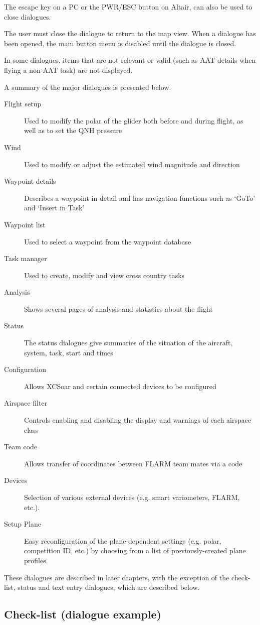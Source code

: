 The escape key on a PC or the PWR/ESC button on Altair, can also be used to
close dialogues.

The user must close the dialogue to return to the map view. When a dialogue
has been opened, the main button menu is disabled until the dialogue is closed.

In some dialogues, items that are not relevant or valid (such as AAT details when
flying a non-AAT task) are not displayed.

A summary of the major dialogues is presented below.
\begin{description}
\item[Flight setup] Used to modify the polar of the glider both before and
during flight, as well as to set the QNH pressure
\item[Wind] Used to modify or adjust the estimated wind magnitude and direction
\item[Waypoint details] Describes a waypoint in detail and has navigation
functions such as `GoTo' and `Insert in Task'
\item[Waypoint list] Used to select a waypoint from the waypoint database
\item[Task manager] Used to create, modify and view cross country tasks
\item[Analysis] Shows several pages of analysis and statistics about the flight
\item[Status] The status dialogues give summaries of the situation of the 
aircraft, system, task, start and times
\item[Configuration] Allows XCSoar and certain connected devices to be
configured
\item[Airspace filter] Controls enabling and disabling the display and warnings
of each airspace class
\item[Team code] Allows transfer of coordinates between FLARM team mates via a 
  code
\item[Devices]  Selection of various external devices (e.g. smart variometers, 
  FLARM, etc.).
\item[Setup Plane]  Easy reconfiguration of the plane-dependent settings (e.g. 
  polar, competition ID, etc.) by choosing from a list of previously-created 
  plane profiles.
\end{description}

These dialogues are described in later chapters, with the exception of the
check-list, status and text entry dialogues, which are described below.


\subsection*{Check-list (dialogue example)}\label{sec:checklist}

